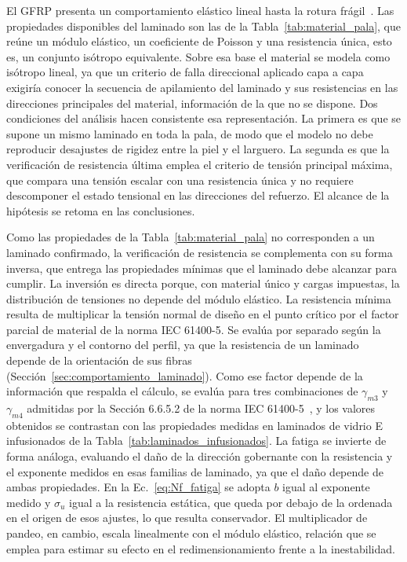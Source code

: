 El GFRP presenta un comportamiento elástico lineal hasta la rotura frágil~\parencite{Moraras2023}. Las propiedades disponibles del laminado son las de la Tabla~\ref{tab:material_pala}, que reúne un módulo elástico, un coeficiente de Poisson y una resistencia única, esto es, un conjunto isótropo equivalente. Sobre esa base el material se modela como isótropo lineal, ya que un criterio de falla direccional aplicado capa a capa exigiría conocer la secuencia de apilamiento del laminado y sus resistencias en las direcciones principales del material, información de la que no se dispone. Dos condiciones del análisis hacen consistente esa representación. La primera es que se supone un mismo laminado en toda la pala, de modo que el modelo no debe reproducir desajustes de rigidez entre la piel y el larguero. La segunda es que la verificación de resistencia última emplea el criterio de tensión principal máxima, que compara una tensión escalar con una resistencia única y no requiere descomponer el estado tensional en las direcciones del refuerzo. El alcance de la hipótesis se retoma en las conclusiones.

Como las propiedades de la Tabla~\ref{tab:material_pala} no corresponden a un laminado confirmado, la verificación de resistencia se complementa con su forma inversa, que entrega las propiedades mínimas que el laminado debe alcanzar para cumplir. La inversión es directa porque, con material único y cargas impuestas, la distribución de tensiones no depende del módulo elástico. La resistencia mínima resulta de multiplicar la tensión normal de diseño en el punto crítico por el factor parcial de material de la norma IEC 61400-5. Se evalúa por separado según la envergadura y el contorno del perfil, ya que la resistencia de un laminado depende de la orientación de sus fibras (Sección~\ref{sec:comportamiento_laminado}). Como ese factor depende de la información que respalda el cálculo, se evalúa para tres combinaciones de $\gamma_{m3}$ y $\gamma_{m4}$ admitidas por la Sección 6.6.5.2 de la norma IEC 61400-5~\parencite*{IEC61400-5}, y los valores obtenidos se contrastan con las propiedades medidas en laminados de vidrio E infusionados de la Tabla~\ref{tab:laminados_infusionados}. La fatiga se invierte de forma análoga, evaluando el daño de la dirección gobernante con la resistencia y el exponente medidos en esas familias de laminado, ya que el daño depende de ambas propiedades. En la Ec.~\ref{eq:Nf_fatiga} se adopta $b$ igual al exponente medido y $\sigma_u$ igual a la resistencia estática, que queda por debajo de la ordenada en el origen de esos ajustes, lo que resulta conservador. El multiplicador de pandeo, en cambio, escala linealmente con el módulo elástico, relación que se emplea para estimar su efecto en el redimensionamiento frente a la inestabilidad.

